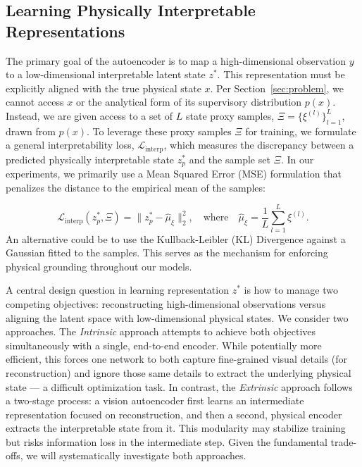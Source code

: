 \documentclass[sigconf]{acmart}
\begin{document}


\subsection{Learning Physically Interpretable Representations}


The primary goal of the autoencoder is to map a high-dimensional observation \(y\) to a low-dimensional interpretable latent state \(z^*\). This representation must be explicitly aligned with the true physical state \(x\). Per Section~\ref{sec:problem}, we cannot access \(x\) or the analytical form of its supervisory distribution \(p(x)\). Instead, we are given access to a set of \(L\) state proxy samples, \(\Xi = \{\xi^{(l)}\}_{l=1}^L\), drawn from \(p(x)\). 
To leverage these proxy samples \(\Xi\) for training, we formulate a general {interpretability loss}, \(\mathcal{L}_{\text{interp}}\), which measures the discrepancy between a predicted physically interpretable state \(z_p^*\) and the sample set \(\Xi\). In our experiments, we primarily use a Mean Squared Error (MSE) formulation that penalizes the distance to the empirical mean of the samples:

\begin{equation}
\mathcal{L}_{\text{interp}}(z_p^*, \Xi) = \| z_p^* - \hat{\mu}_{\xi} \|_2^2, \quad \text{where} \quad \hat{\mu}_{\xi} = \frac{1}{L}\sum_{l=1}^L \xi^{(l)}.
\label{eq:interp_loss}
\end{equation}
An alternative could be to use the Kullback-Leibler (KL) Divergence against a Gaussian fitted to the samples. This serves as the mechanism for enforcing physical grounding throughout our models.



A central design question in learning representation \(z^*\) is how to manage two competing objectives: reconstructing high-dimensional observations versus aligning the latent space with low-dimensional physical states. We consider two approaches. The \emph{Intrinsic} approach attempts to achieve both objectives simultaneously with a single, end-to-end encoder. While potentially more efficient, this forces one network to both capture fine-grained visual details (for reconstruction) and ignore those same details to extract the underlying physical state --- a difficult optimization task. In contrast, the \emph{Extrinsic} approach follows a two-stage process: a vision autoencoder first learns an intermediate representation focused on reconstruction, and then a second, physical encoder extracts the interpretable state from it. This modularity may stabilize training but risks information loss in the intermediate step. Given the fundamental trade-offs, we will systematically investigate both approaches.
\end{document}
